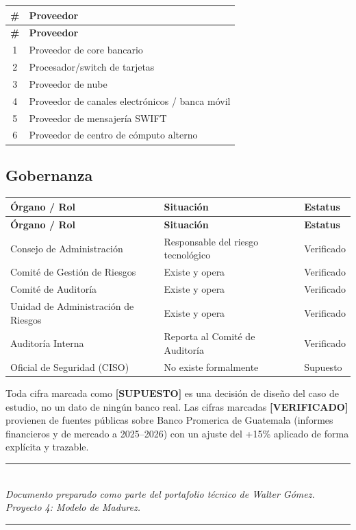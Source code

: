 \documentclass[11pt,a4paper]{article}
\begin{document}
	\begin{longtable}{@{}cp{9cm}@{}}
		\toprule
		\textbf{\#} & \textbf{Proveedor} \\ \midrule
		\endfirsthead
		\toprule
		\textbf{\#} & \textbf{Proveedor} \\ \midrule
		\endhead
		1 & Proveedor de core bancario \\
		2 & Procesador/switch de tarjetas \\
		3 & Proveedor de nube \\
		4 & Proveedor de canales electrónicos / banca móvil \\
		5 & Proveedor de mensajería SWIFT \\
		6 & Proveedor de centro de cómputo alterno \\
		\bottomrule
	\end{longtable}
	
	\subsection{Gobernanza}
	
	\begin{longtable}{@{}p{6.5cm}p{6cm}p{2cm}@{}}
		\toprule
		\textbf{Órgano / Rol} & \textbf{Situación} & \textbf{Estatus} \\ \midrule
		\endfirsthead
		\toprule
		\textbf{Órgano / Rol} & \textbf{Situación} & \textbf{Estatus} \\ \midrule
		\endhead
		Consejo de Administración & Responsable del riesgo tecnológico & Verificado \\
		Comité de Gestión de Riesgos & Existe y opera & Verificado \\
		Comité de Auditoría & Existe y opera & Verificado \\
		Unidad de Administración de Riesgos & Existe y opera & Verificado \\
		Auditoría Interna & Reporta al Comité de Auditoría & Verificado \\
		Oficial de Seguridad (CISO) & No existe formalmente & Supuesto \\
		\bottomrule
	\end{longtable}
	
	\begin{warnbox}
		Toda cifra marcada como \textbf{[SUPUESTO]} es una decisión de diseño del caso de estudio, no un dato de ningún banco real. Las cifras marcadas \textbf{[VERIFICADO]} provienen de fuentes públicas sobre Banco Promerica de Guatemala (informes financieros y de mercado a 2025--2026) con un ajuste del +15\% aplicado de forma explícita y trazable.
	\end{warnbox}
	
	\vspace{1cm}
	
	\begin{center}
		\textcolor{bancogray}{\rule{0.5\textwidth}{0.4pt}}\\[0.3cm]
		\textit{Documento preparado como parte del portafolio técnico de Walter Gómez.\\
			Proyecto 4: Modelo de Madurez.}\\[0.3cm]
		\textcolor{bancogray}{\rule{0.5\textwidth}{0.4pt}}
	\end{center}
	
\end{document}
